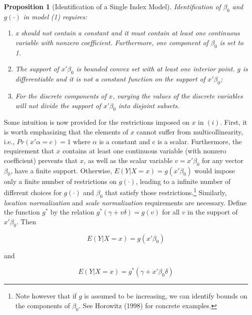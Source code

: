 \documentclass[a4paper]{article}
\begin{document}
\newtheorem{prop}{Proposition}[section]

\begin{prop}[Identification of a Single Index Model] 
Identification of $\beta_0$ and $g(\cdot)$ in model (1) requires:
\begin{enumerate}[label=(\roman*)]
\item x should not contain a constant and it must contain at least one continuous variable with nonzero coefficient. Furthermore, one component of $\beta_0$ is set to 1. 
\item The support of $x'\beta_0$ is bounded convex set with at least one interior point. $g$ is differentiable and it is not a constant function on the support of $x'\beta_0$;
\item For the discrete components of $x$, varying the values of the discrete variables will not divide the support of $x'\beta_0$ into disjoint subsets.
\end{enumerate}
\end{prop}

Some intuition is now provided for the restrictions imposed on $x$ in $(i)$. First, it is worth emphasizing that the elements of $x$ cannot suffer from multicollinearity, i.e., $Pr(x'\alpha = c) = 1$ where $\alpha$ is a constant and c is a scalar. Furthermore, the requirement that $x$ contains at least one continuous variable (with nonzero coefficient) prevents that $x$, as well as the scalar variable $ v = x'\beta_0 $ for any vector $\beta_0$, have a finite support. Otherwise, $E(Y|X = x) = g(x'\beta_0)$ would impose only a finite number of restrictions on $g(\cdot)$, leading to a infinite number of different choices for $g(\cdot)$ and $\beta_0$ that satisfy those restrictions.\footnote{Note however that if $g$ is assumed to be increasing, we can identify bounds on the components of $\beta_0$. See Horowitz (1998) for  concrete examples.} Similarly, \textit{location normalization} and \textit{scale normalization} requirements are necessary. Define the function $g^{*}$ by the relation $g^{*}(\gamma + v\delta) = g(v)$ for all $v$ in the support of $x'\beta_0$. Then

\begin{equation}
E(Y|X = x) = g(x'\beta_0)
\end{equation}

and

\begin{equation}
E(Y|X = x) = g^*(\gamma + x'\beta_0\delta)
\end{equation}
\end{document}
